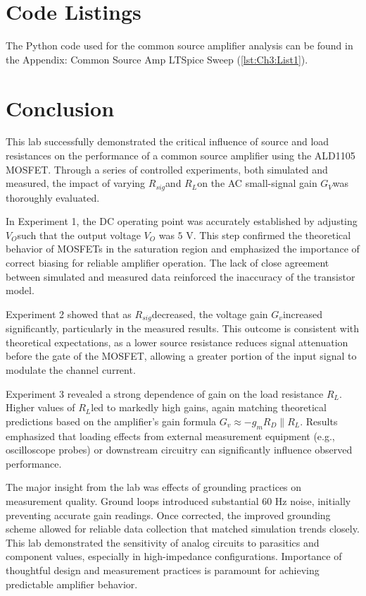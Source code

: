 \section{Code Listings}

The Python code used for the common source amplifier analysis can be found in the Appendix: Common Source Amp LTSpice Sweep (\cref{lst:Ch3:List1}).

\section{Conclusion}
\singlespacing
This lab successfully demonstrated the critical influence of source and load resistances on the performance of a common source amplifier using the ALD1105 MOSFET. Through a series of controlled experiments, both simulated and measured, the impact of varying $R_{sig}$​​ and $R_{L}$​​ on the AC small-signal gain $G_{V}$​ was thoroughly evaluated.

In Experiment 1, the DC operating point was accurately established by adjusting $V_{O}$​ such that the output voltage $V_{O}$ was $5$ V. This step confirmed the theoretical behavior of MOSFETs in the saturation region and emphasized the importance of correct biasing for reliable amplifier operation. The lack of close agreement between simulated and measured data reinforced the inaccuracy of the transistor model.

Experiment 2 showed that as $R_{sig}$​​ ​ decreased, the voltage gain $G_v$​ increased significantly, particularly in the measured results. This outcome is consistent with theoretical expectations, as a lower source resistance reduces signal attenuation before the gate of the MOSFET, allowing a greater portion of the input signal to modulate the channel current.
 
Experiment 3 revealed a strong dependence of gain on the load resistance $R_{L}$​​. Higher values of $R_{L}$​ led to markedly high gains, again matching theoretical predictions based on the amplifier’s gain formula $G_v \approx -g_m R_D \parallel R_L$​.  Results emphasized that loading effects from external measurement equipment (e.g., oscilloscope probes) or downstream circuitry can significantly influence observed performance.

The major insight from the lab was effects of grounding practices on measurement quality. Ground loops introduced substantial 60 Hz noise, initially preventing accurate gain readings. Once corrected, the improved grounding scheme allowed for reliable data collection that matched simulation trends closely. This lab demonstrated the sensitivity of analog circuits to parasitics and component values, especially in high-impedance configurations. Importance of thoughtful design and measurement practices is paramount for achieving predictable amplifier behavior.

\clearpage
\printbibliography[heading=subbibliography]